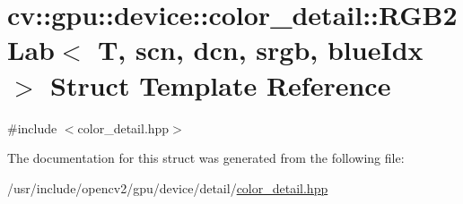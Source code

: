 \hypertarget{structcv_1_1gpu_1_1device_1_1color__detail_1_1RGB2Lab}{\section{cv\-:\-:gpu\-:\-:device\-:\-:color\-\_\-detail\-:\-:R\-G\-B2\-Lab$<$ T, scn, dcn, srgb, blue\-Idx $>$ Struct Template Reference}
\label{structcv_1_1gpu_1_1device_1_1color__detail_1_1RGB2Lab}
}


{\ttfamily \#include $<$color\-\_\-detail.\-hpp$>$}



The documentation for this struct was generated from the following file\-:\begin{DoxyCompactItemize}
\item 
/usr/include/opencv2/gpu/device/detail/\hyperlink{color__detail_8hpp}{color\-\_\-detail.\-hpp}\end{DoxyCompactItemize}
